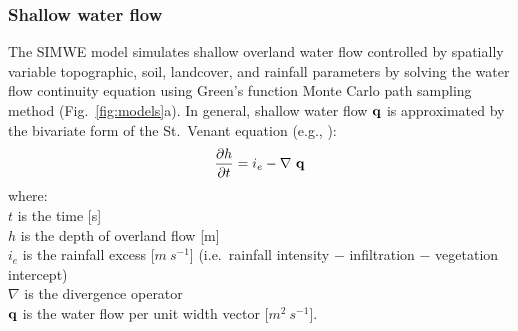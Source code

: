 \documentclass[gmd, manuscript]{copernicus}
\begin{document}


\subsubsection{Shallow water flow}

The SIMWE model simulates shallow overland water flow
controlled by spatially variable topographic, soil, landcover, 
and rainfall parameters by solving the water flow continuity equation 
using Green's function Monte Carlo path sampling method 
(Fig.~\ref{fig:models}a). 
In general, shallow water flow ${\bf q}$ is approximated by
the bivariate form of the St.~Venant equation (e.g., \cite{Julien1995}):
\begin{equation}
\label{eq:water}
{\partial h \over \partial t} =
 i_e - \nabla ~ {\bf q}
\end{equation}
{\small
\noindent
where: \\
\noindent
\hspace*{0.5em} $t$ is the time [\unit{s}] \\
\hspace*{0.5em} $h$ is the depth of overland flow [\unit{m}]\\
\hspace*{0.5em} $i_e$ is the rainfall excess [$\unit{m~s^{-1}}$]
(i.e.~rainfall intensity $-$ infiltration $-$ vegetation intercept)\\
\hspace*{0.5em} $\nabla$ is the divergence operator\\
\hspace*{0.5em} ${\bf q}$ is the water flow per unit width vector [$\unit{m}^2~\unit{s}^{-1}$]. 
}
\end{document}
